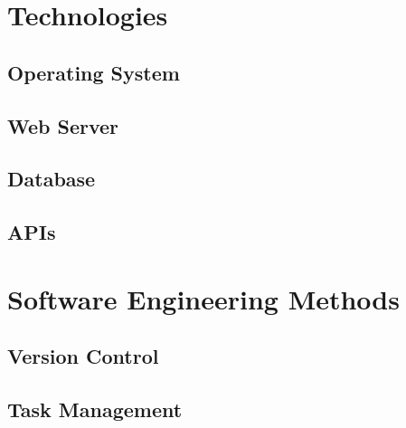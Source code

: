 \section{Technologies}

\subsection{Operating System}

\subsection{Web Server}

\subsection{Database}

\subsection{APIs}

\section{Software Engineering Methods}

\subsection{Version Control}

\subsection{Task Management}

\subsection{}

